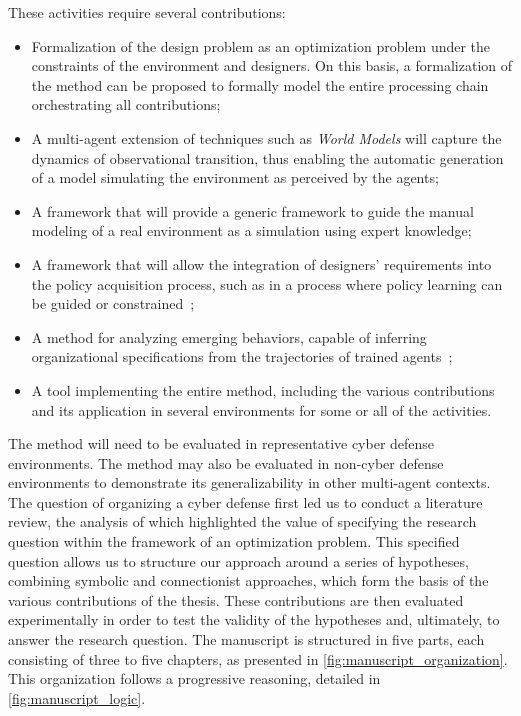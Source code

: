 \noindent These activities require several contributions:
\begin{itemize}
  \item Formalization of the design problem as an optimization problem under the constraints of the environment and designers. On this basis, a formalization of the method can be proposed to formally model the entire processing chain orchestrating all contributions;

  \item A multi-agent extension of  techniques such as \textit{World Models} will capture the dynamics of observational transition, thus enabling the automatic generation of a model simulating the environment as perceived by the agents;
  \item A framework that will provide a generic framework to guide the manual modeling of a real environment as a simulation using expert knowledge;

  \item A framework that will allow the integration of designers' requirements into the policy acquisition process, such as in a  process where policy learning can be guided or constrained~;
  \item A method for analyzing emerging behaviors, capable of inferring organizational specifications from the trajectories of trained agents~;
  \item A tool implementing the entire method, including the various contributions and its application in several environments for some or all of the activities.
\end{itemize}
\noindent The method will need to be evaluated in representative cyber defense environments. The method may also be evaluated in non-cyber defense environments to demonstrate its generalizability in other multi-agent contexts.
\
\bigskip
{}\\
\noindent
The question of organizing a cyber defense  first led us to conduct a literature review, the analysis of which highlighted the value of specifying the research question within the framework of an optimization problem. This specified question allows us to structure our approach around a series of hypotheses, combining symbolic and connectionist approaches, which form the basis of the various contributions of the thesis. These contributions are then evaluated experimentally in order to test the validity of the hypotheses and, ultimately, to answer the research question.
\noindent
The manuscript is structured in five parts, each consisting of three to five chapters, as presented in \autoref{fig:manuscript_organization}. This organization follows a progressive reasoning, detailed in \autoref{fig:manuscript_logic}.
